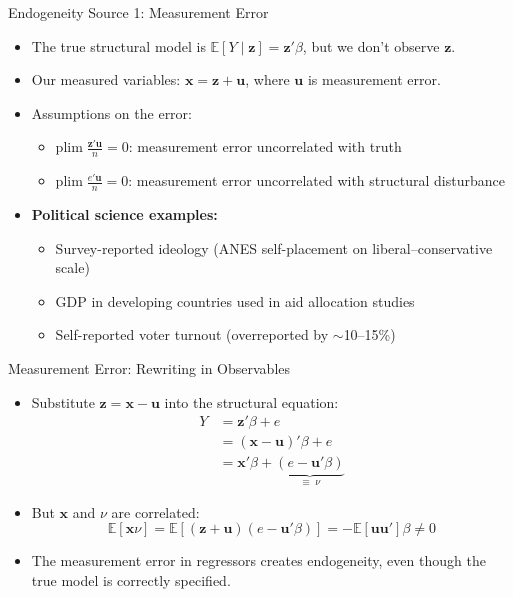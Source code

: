 \documentclass[aspectratio=169, handout]{beamer}
\numberwithin{equation}{section}
\begin{document}
\begin{frame}{Endogeneity Source 1: Measurement Error}
\begin{itemize}
\item The true structural model is $\mathbb{E}[Y\mid \bm{z}]=\bm{z}'\beta$, but we don't observe $\bm{z}$.
\item Our measured variables: $\bm{x}=\bm{z}+\bm{u}$, where $\bm{u}$ is measurement error.
\item Assumptions on the error:
\begin{itemize}
\item $\text{plim}\;\frac{\bm{z}'\bm{u}}{n}=0$: measurement error uncorrelated with truth
\item $\text{plim}\;\frac{e'\bm{u}}{n}=0$: measurement error uncorrelated with structural disturbance
\end{itemize}
\item \textbf{Political science examples:}
\begin{itemize}
\item Survey-reported ideology (ANES self-placement on liberal--conservative scale)
\item GDP in developing countries used in aid allocation studies
\item Self-reported voter turnout (overreported by $\sim$10--15\%)
\end{itemize}
\end{itemize}
\end{frame}


\begin{frame}{Measurement Error: Rewriting in Observables}
\begin{itemize}
\item Substitute $\bm{z}=\bm{x}-\bm{u}$ into the structural equation:
\begin{align*}
Y&=\bm{z}'\beta+e\\
&=(\bm{x}-\bm{u})'\beta+e\\
&=\bm{x}'\beta+\underbrace{(e-\bm{u}'\beta)}_{\equiv\;\nu}
\end{align*}
\item But $\bm{x}$ and $\nu$ are correlated:
$$\mathbb{E}[\bm{x}\nu]=\mathbb{E}[(\bm{z}+\bm{u})(e-\bm{u}'\beta)]=-\mathbb{E}[\bm{u}\bm{u}']\beta\neq 0$$
\item The measurement error in regressors creates endogeneity, even though the true model is correctly specified.
\end{itemize}
\end{frame}
\end{document}

